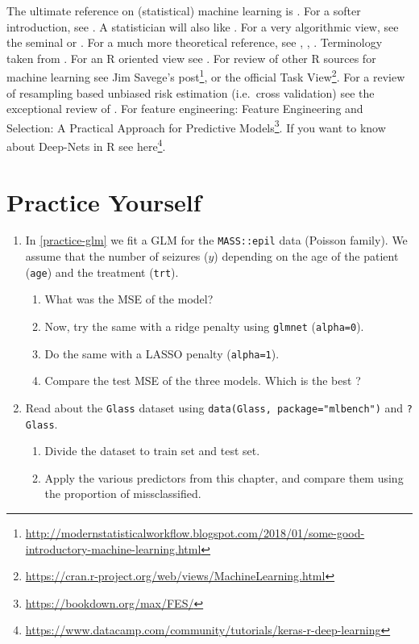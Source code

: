 \documentclass[]{book}
\providecommand{\tightlist}{%
  \setlength{\itemsep}{0pt}\setlength{\parskip}{0pt}}
\renewcommand{\href}[2]{#2\footnote{\url{#1}}}
\theoremstyle{definition}
\theoremstyle{definition}
\theoremstyle{definition}
\theoremstyle{remark}
\begin{document}
The ultimate reference on (statistical) machine learning is \citet{friedman2001elements}.
For a softer introduction, see \citet{james2013introduction}.
A statistician will also like \citet{ripley2007pattern}.
For a very algorithmic view, see the seminal \citet{leskovec2014mining} or \citet{conway2012machine}.
For a much more theoretical reference, see \citet{mohri2012foundations}, \citet{vapnik2013nature}, \citet{shalev2014understanding}.
Terminology taken from \citet{sammut2011encyclopedia}.
For an R oriented view see \citet{lantz2013machine}.
For review of other R sources for machine learning see \href{http://modernstatisticalworkflow.blogspot.com/2018/01/some-good-introductory-machine-learning.html}{Jim Savege's post}, or the official \href{https://cran.r-project.org/web/views/MachineLearning.html}{Task View}.
For a review of resampling based unbiased risk estimation (i.e.~cross validation) see the exceptional review of \citet{arlot2010survey}.
For feature engineering: \href{https://bookdown.org/max/FES/}{Feature Engineering and Selection: A Practical Approach for Predictive Models}.
If you want to know about Deep-Nets in R see \href{https://www.datacamp.com/community/tutorials/keras-r-deep-learning}{here}.

\hypertarget{practice-yourself-6}{%
\section{Practice Yourself}\label{practice-yourself-6}}

\begin{enumerate}
\def\labelenumi{\arabic{enumi}.}
\tightlist
\item
  In \ref{practice-glm} we fit a GLM for the \texttt{MASS::epil} data (Poisson family). We assume that the number of seizures (\(y\)) depending on the age of the patient (\texttt{age}) and the treatment (\texttt{trt}).

  \begin{enumerate}
  \def\labelenumii{\arabic{enumii}.}
  \tightlist
  \item
    What was the MSE of the model?
  \item
    Now, try the same with a ridge penalty using \texttt{glmnet} (\texttt{alpha=0}).
  \item
    Do the same with a LASSO penalty (\texttt{alpha=1}).
  \item
    Compare the test MSE of the three models. Which is the best ?
  \end{enumerate}
\item
  Read about the \texttt{Glass} dataset using \texttt{data(Glass,\ package="mlbench")} and \texttt{?Glass}.

  \begin{enumerate}
  \def\labelenumii{\arabic{enumii}.}
  \tightlist
  \item
    Divide the dataset to train set and test set.
  \item
    Apply the various predictors from this chapter, and compare them using the proportion of missclassified.
  \end{enumerate}
\end{enumerate}
\end{document}
